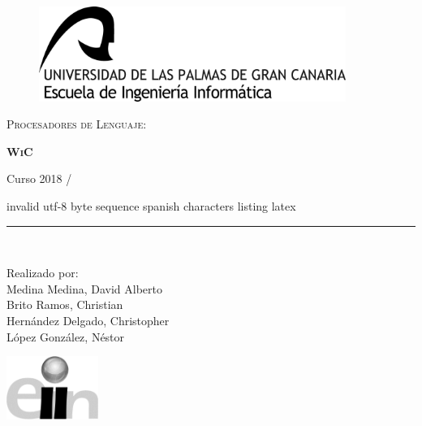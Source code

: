 \documentclass[11pt, english]{article}
\makeatletter
\newcounter{unomenos}
\gdef\@date{ Curso  2018 / \arabic{unomenos}}
\makeatother
\begin{document}
	
	\begin{titlepage}
		
		\begin{center}
			\vspace*{-1in}
			\begin{figure}[htb]
				\begin{center}
					\includegraphics[width=10cm]{../res/pics/logo.jpg}
				\end{center}
			\end{figure}
			
			\vspace*{0.4in}
			\begin{large}
				\textsc{Procesadores de Lenguaje}:\\
			\end{large}
			\vspace*{0.2in}
			\begin{Large}
				\textbf{\textsc{WiC}}\\
			\end{Large}
			\vspace*{0.3in}
			\begin{large}
				\@date\\
			\end{large}
			\vspace*{0.3in}invalid utf-8 byte sequence spanish characters listing latex
			\rule{80mm}{0.1mm}\\
			\vspace*{0.1in}
			\begin{large}
				Realizado por: \\
				
				Medina Medina, David Alberto  \\
				Brito Ramos, Christian  \\
				Hernández Delgado, Christopher \\
				López González, Néstor \\
				\vspace*{0.3in}
			\end{large}
			\includegraphics[width=3cm]{../res/pics/LogoEscuela.jpg}
		\end{center}
	\end{titlepage}
	
\end{document}
